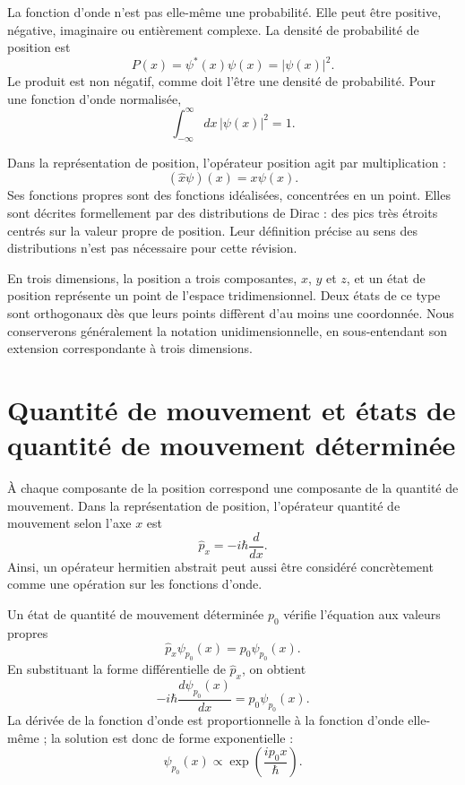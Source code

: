 La fonction d’onde n’est pas elle-même une probabilité. Elle peut être positive, négative, imaginaire ou entièrement complexe. La densité de probabilité de position est
\begin{equation}
P(x)=\psi^*(x)\psi(x)=|\psi(x)|^2.
\end{equation}
Le produit est non négatif, comme doit l’être une densité de probabilité. Pour une fonction d’onde normalisée,
\begin{equation}
\int_{-\infty}^{\infty}dx\,|\psi(x)|^2=1.
\end{equation}

Dans la représentation de position, l’opérateur position agit par multiplication :
\begin{equation}
(\hat x\psi)(x)=x\psi(x).
\end{equation}
Ses fonctions propres sont des fonctions idéalisées, concentrées en un point. Elles sont décrites formellement par des distributions de Dirac : des pics très étroits centrés sur la valeur propre de position. Leur définition précise au sens des distributions n’est pas nécessaire pour cette révision.

En trois dimensions, la position a trois composantes, \(x\), \(y\) et \(z\), et un état de position représente un point de l’espace tridimensionnel. Deux états de ce type sont orthogonaux dès que leurs points diffèrent d’au moins une coordonnée. Nous conserverons généralement la notation unidimensionnelle, en sous-entendant son extension correspondante à trois dimensions.

\section{Quantité de mouvement et états de quantité de mouvement déterminée}

À chaque composante de la position correspond une composante de la quantité de mouvement. Dans la représentation de position, l’opérateur quantité de mouvement selon l’axe \(x\) est
\begin{equation}
\hat p_x=-i\hbar\frac{d}{dx}.
\end{equation}
Ainsi, un opérateur hermitien abstrait peut aussi être considéré concrètement comme une opération sur les fonctions d’onde.

Un état de quantité de mouvement déterminée \(p_0\) vérifie l’équation aux valeurs propres
\begin{equation}
\hat p_x\psi_{p_0}(x)=p_0\psi_{p_0}(x).
\end{equation}
En substituant la forme différentielle de \(\hat p_x\), on obtient
\begin{equation}
-i\hbar\frac{d\psi_{p_0}(x)}{dx}
=p_0\psi_{p_0}(x).
\end{equation}
La dérivée de la fonction d’onde est proportionnelle à la fonction d’onde elle-même ; la solution est donc de forme exponentielle :
\begin{equation}
\psi_{p_0}(x)\propto
\exp\left(\frac{ip_0x}{\hbar}\right).
\end{equation}

